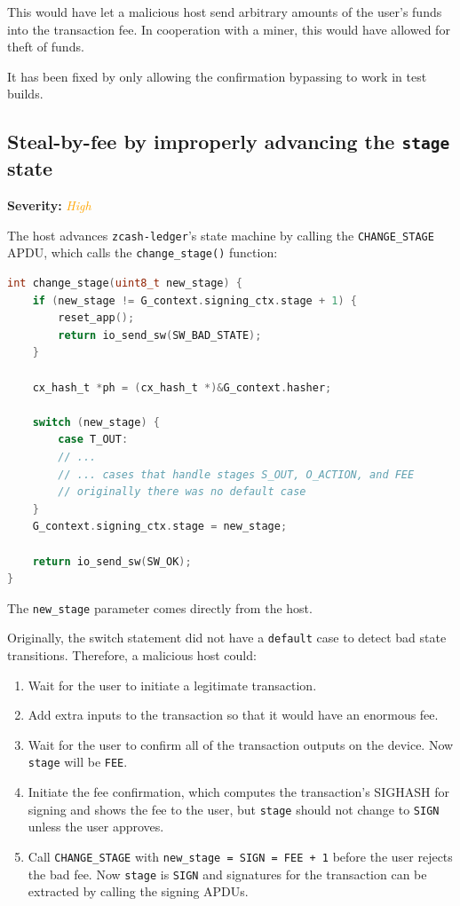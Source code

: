 \documentclass[10pt,titlepage]{article}
\newcommand{\HighIssue}{\textcolor{orange}{\emph{High}}}
\begin{document}
This would have let a malicious host send arbitrary amounts of the user's funds
into the transaction fee. In cooperation with a miner, this would have allowed
for theft of funds.

It has been fixed by only allowing the confirmation bypassing to work in test
builds.

\subsection{Steal-by-fee by improperly advancing the \texttt{stage} state} \label{issuestageadvance}
\textbf{Severity:} \HighIssue

The host advances \texttt{zcash-ledger}'s state machine by calling the
\texttt{CHANGE\_STAGE} APDU, which calls the \texttt{change\_stage()} function:

\begin{lstlisting}[language=c]
int change_stage(uint8_t new_stage) {
    if (new_stage != G_context.signing_ctx.stage + 1) {
        reset_app();
        return io_send_sw(SW_BAD_STATE);
    }

    cx_hash_t *ph = (cx_hash_t *)&G_context.hasher;

    switch (new_stage) {
        case T_OUT:
        // ...
        // ... cases that handle stages S_OUT, O_ACTION, and FEE
        // originally there was no default case
    }
    G_context.signing_ctx.stage = new_stage;

    return io_send_sw(SW_OK);
}
\end{lstlisting}

The \texttt{new\_stage} parameter comes directly from the host. 

Originally, the switch statement did not have a \texttt{default} case to detect
bad state transitions. Therefore, a malicious host could:

\begin{enumerate}
      \item Wait for the user to initiate a legitimate transaction.
      \item Add extra inputs to the transaction so that it would have an enormous fee.
      \item Wait for the user to confirm all of the transaction outputs on the
      device. Now \texttt{stage} will be \texttt{FEE}.
      \item Initiate the fee confirmation, which computes the transaction's
      SIGHASH for signing and shows the fee to the user, but \texttt{stage}
      should not change to \texttt{SIGN} unless the user approves.
      \item Call \texttt{CHANGE\_STAGE} with \texttt{new\_stage = SIGN = FEE +
      1} before the user rejects the bad fee. Now \texttt{stage} is
      \texttt{SIGN} and signatures for the transaction can be extracted by
      calling the signing APDUs.
\end{enumerate}
\end{document}
